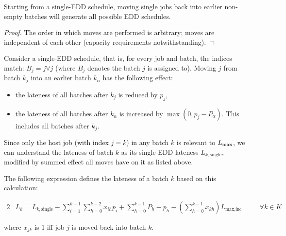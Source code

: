 \documentclass[13pt, letterpaper, oneside]{book}
\begin{document}
\begin{proposition}
Starting from a single-EDD schedule, moving single jobs back into earlier
non-empty batches will generate all possible EDD schedules.
\end{proposition}
\begin{proof}
The order in which moves are performed is arbitrary; moves are independent of
each other (capacity requirements notwithstanding).
\end{proof}
 
Consider a single-EDD schedule, that is, for every job and batch, the indices
match: $B_j = j \forall j$ (where $B_j$ denotes the batch $j$ is assigned to).
Moving $j$ from batch $k_j$ into an earlier batch $k_\alpha$ has the following
effect:
\begin{itemize}
\item{the lateness of all batches after $k_j$ is reduced by $p_j$,}
\item{the lateness of all batches after $k_\alpha$ is increased by $\max(0,p_j -
P_\alpha)$. This includes all batches after $k_j$.}
\end{itemize}
Since only the host job (with index $j = k$) in any batch $k$ is relevant to
$L_{\text{max}}$, we can understand the lateness of batch $k$ as its single-EDD lateness
$L_{k,\text{single}}$, modified by summed effect all moves have on it as listed
above.
 
The following expression defines the lateness of a batch $k$ based on this
calculation:
 
\begin{alignat}{2}
& L_k = L_{k,\text{single}} - \sum_{i = 1}^{k-1} \sum_{h = 0}^{k-2} x_{ih} p_i
+ \sum_{h = 0}^{k-1} P_h - p_h - (\sum_{h=0}^{k-1} x_{kh}) L_\text{max,inc}
\quad && \forall k \in K
\end{alignat}
 
where $x_{jk}$ is 1 iff job $j$ is moved back into batch $k$.








\begin{comment}
\chapter{My solution}
\section{MIP formulation improvements}
\section{CP formulation improvements}

\chapter{Discussion}


\end{comment}
\pagebreak
\end{document}
